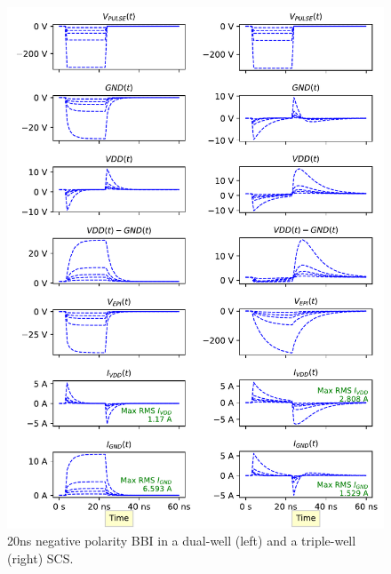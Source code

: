 \documentclass[10pt, conference, compsocconf]{IEEEtran}
\begin{document}
\begin{figure}[!hbtp]
\centering
\includegraphics[width=6in]{NEGATIVE_COMP.pdf}
\caption{20ns negative polarity BBI in a dual-well (left) and a triple-well (right) SCS.}
\label{fig_neg_comp}
\end{figure}
\end{document}
